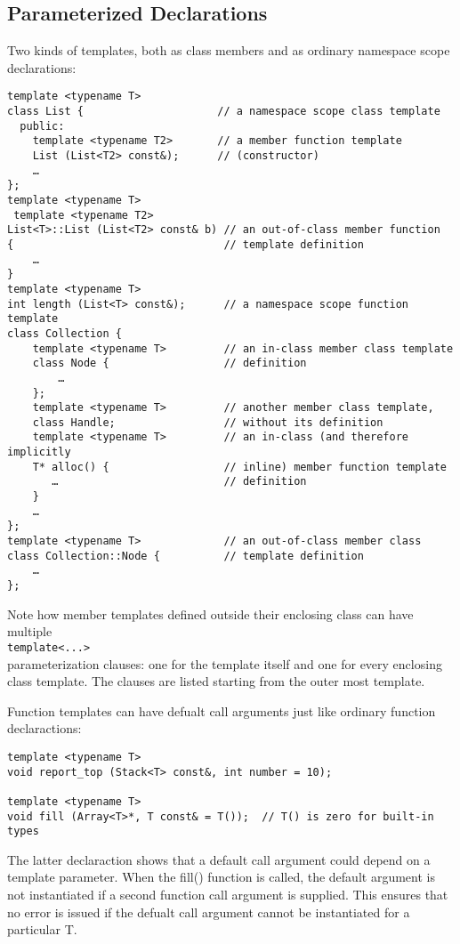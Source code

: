 \documentclass[11pt, a4paper]{book}
\begin{document}
\subsection{Parameterized Declarations}
Two kinds of templates, both as class members and as ordinary namespace scope declarations:
\begin{verbatim}
template <typename T> 
class List {                     // a namespace scope class template 
  public: 
    template <typename T2>       // a member function template 
    List (List<T2> const&);      // (constructor) 
    … 
}; 
template <typename T> 
 template <typename T2> 
List<T>::List (List<T2> const& b) // an out-of-class member function 
{                                 // template definition 
    … 
} 
template <typename T> 
int length (List<T> const&);      // a namespace scope function template 
class Collection { 
    template <typename T>         // an in-class member class template 
    class Node {                  // definition 
        … 
    }; 
    template <typename T>         // another member class template, 
    class Handle;                 // without its definition 
    template <typename T>         // an in-class (and therefore implicitly 
    T* alloc() {                  // inline) member function template 
       …                          // definition 
    } 
    … 
}; 
template <typename T>             // an out-of-class member class 
class Collection::Node {          // template definition 
    … 
}; 
\end{verbatim}

Note how member templates defined outside their enclosing class can have multiple \\\verb|template<...>|\\ parameterization clauses: one for the template itself and one for every enclosing class template. The clauses are listed starting from the outer most template.

Function templates can have defualt call arguments just like ordinary function declaractions:
\begin{verbatim}
template <typename T> 
void report_top (Stack<T> const&, int number = 10); 

template <typename T> 
void fill (Array<T>*, T const& = T());  // T() is zero for built-in types 
\end{verbatim}

The latter declaraction shows that a default call argument could depend on a template parameter. When the fill() function is called, the default argument is not instantiated if a second function call argument is supplied. This ensures that no error is issued if the defualt call argument cannot be instantiated for a particular T.
\end{document}
